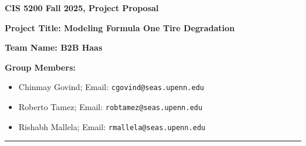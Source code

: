 \documentclass[english]{article}
\begin{document}
\begin{center}
    \textbf{\Large CIS 5200 Fall 2025, Project Proposal}
\end{center}



\vspace{15pt}



\textbf{\Large{Project Title: Modeling Formula One Tire Degradation}} 

\vspace{1cm}

\textbf{Team Name: B2B Haas}

\vspace{5mm}

\textbf{Group Members:}

\begin{itemize}
 \item Chinmay Govind; Email: \texttt{cgovind@seas.upenn.edu}
 \item Roberto Tamez; Email: \texttt{robtamez@seas.upenn.edu}
 \item Rishabh Mallela; Email: \texttt{rmallela@seas.upenn.edu}
\end{itemize}

\vspace{8pt}



\vspace{1cm}

\noindent\rule{\textwidth}{0.4pt}


\end{document}
